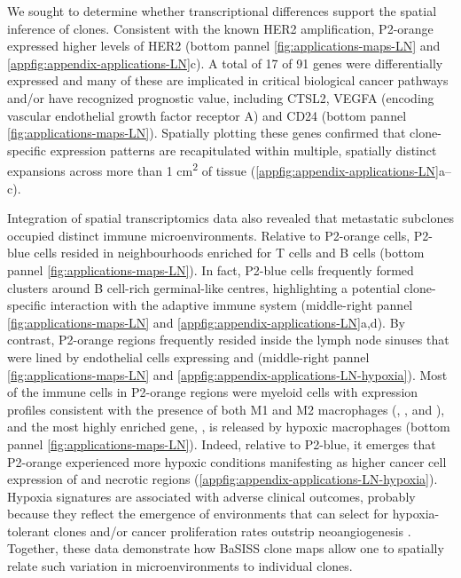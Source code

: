 We sought to determine whether transcriptional differences support the spatial inference of clones. Consistent with the known HER2 amplification, P2-orange expressed higher levels of HER2 (bottom pannel \cref{fig:applications-maps-LN} and \cref{appfig:appendix-applications-LN}c). A total of 17 of 91 genes were differentially expressed and many of these are implicated in critical biological cancer pathways and/or have recognized prognostic value, including CTSL2, VEGFA (encoding vascular endothelial growth factor receptor A) and CD24 \parencite{Sereesongsaeng2020-vp, Kwon2015-jk} (bottom pannel \cref{fig:applications-maps-LN}). Spatially plotting these genes confirmed that clone-specific expression patterns are recapitulated within multiple, spatially distinct expansions across more than 1 cm\textsuperscript{2} of tissue (\cref{appfig:appendix-applications-LN}a–c).

Integration of spatial transcriptomics data also revealed that metastatic subclones occupied distinct immune microenvironments. Relative to P2-orange cells, P2-blue cells resided in neighbourhoods enriched for T cells and B cells (bottom pannel \cref{fig:applications-maps-LN}). In fact, P2-blue cells frequently formed clusters around B cell-rich germinal-like centres, highlighting a potential clone-specific interaction with the adaptive immune system (middle-right pannel \cref{fig:applications-maps-LN} and \cref{appfig:appendix-applications-LN}a,d). By contrast, P2-orange regions frequently resided inside the lymph node sinuses that were lined by endothelial cells expressing  and  (middle-right pannel \cref{fig:applications-maps-LN} and \cref{appfig:appendix-applications-LN-hypoxia}). Most of the immune cells in P2-orange regions were myeloid cells with expression profiles consistent with the presence of both M1 and M2 macrophages (, ,  and ), and the most highly enriched gene, , is released by hypoxic macrophages \parencite{Li2015-ng} (bottom pannel \cref{fig:applications-maps-LN}). Indeed, relative to P2-blue, it emerges that P2-orange experienced more hypoxic conditions manifesting as higher cancer cell expression of  and necrotic regions (\cref{appfig:appendix-applications-LN-hypoxia}). Hypoxia signatures are associated with adverse clinical outcomes, probably because they reflect the emergence of environments that can select for hypoxia-tolerant clones and/or cancer proliferation rates outstrip neoangiogenesis \parencite{Cairns2004-vs}. Together, these data demonstrate how \ac{BaSISS} clone maps allow one to spatially relate such variation in microenvironments to individual clones.

